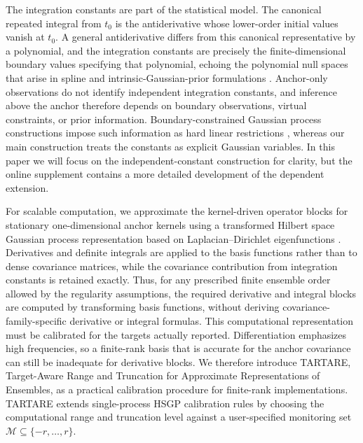 \documentclass[11pt,a4paper]{article}
\theoremstyle{definition}
\theoremstyle{remark}
\begin{document}
The integration constants are part of the statistical model.  The canonical repeated integral from \(t_0\) is the antiderivative whose lower-order initial values vanish at \(t_0\).  A general antiderivative differs from this canonical representative by a polynomial, and the integration constants are precisely the finite-dimensional boundary values specifying that polynomial, echoing the polynomial null spaces that arise in spline and intrinsic-Gaussian-prior formulations \citep{kimeldorf1970correspondence,wahba1978improper,matheron1973intrinsic}.  Anchor-only observations do not identify independent integration constants, and inference above the anchor therefore depends on boundary observations, virtual constraints, or prior information. Boundary-constrained Gaussian process constructions impose such information as hard linear restrictions \citep{langehegermann2021linearly,gulian2022gaussian}, whereas our main construction treats the constants as explicit Gaussian variables.  In this paper we will focus on the independent-constant construction for clarity, but the online supplement contains a more detailed development of the dependent extension.

For scalable computation, we approximate the kernel-driven operator blocks for stationary one-dimensional anchor kernels using a transformed Hilbert space Gaussian process representation based on Laplacian--Dirichlet eigenfunctions \citep{solin2020hilbert}.  Derivatives and definite integrals are applied to the basis functions rather than to dense covariance matrices, while the covariance contribution from integration constants is retained exactly.  Thus, for any prescribed finite ensemble order allowed by the regularity assumptions, the required derivative and integral blocks are computed by transforming basis functions, without deriving covariance-family-specific derivative or integral formulas.  This computational representation must be calibrated for the targets actually reported. Differentiation emphasizes high frequencies, so a finite-rank basis that is accurate for the anchor covariance can still be inadequate for derivative blocks. We therefore introduce TARTARE, Target-Aware Range and Truncation for Approximate Representations of Ensembles, as a practical calibration procedure for finite-rank implementations. TARTARE extends single-process HSGP calibration rules by choosing the computational range and truncation level against a user-specified monitoring set \(\mathcal M\subseteq\{-r,\ldots,r\}\).
\end{document}
